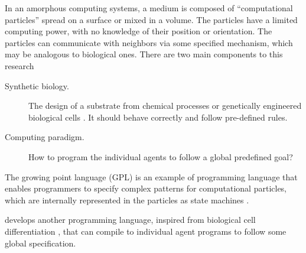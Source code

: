In an amorphous computing systems, a medium is composed of ``computational
particles'' spread on a surface or mixed in a volume. The particles have a
limited computing power, with no knowledge of their position or orientation. The
particles can communicate with neighbors via some specified mechanism, which may
be analogous to biological ones. There are two main components to this research
\begin{description}
  \item[Synthetic biology.] The design of a substrate from chemical processes or
        genetically engineered biological cells
        \parencite{weissVivoDigitalCircuits2002}. It should behave correctly and
        follow pre-defined rules.
  \item[Computing paradigm.] How to program the individual agents to follow a
        global predefined goal?
        \parencite{nagpalProgrammableSelfassemblyConstructing2001}
\end{description}


The growing point language (GPL) is an example of programming language that
enables programmers to specify complex patterns for computational particles,
which are internally represented in the particles as state machines
\parencite{cooreBotanicalComputingDevelopmental1999}.

\cite{nagpalProgrammableSelfassemblyUsing2002} develops another programming
language, inspired from biological cell differentiation
\parencite{lawrenceMakingFlyGenetics1992,
  wolpertPositionalInformationSpatial1969}, that can compile to individual agent
programs to follow some global specification.
